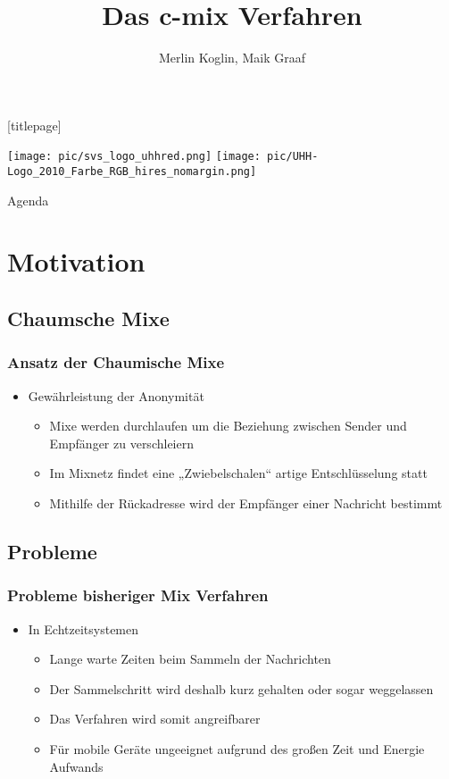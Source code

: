 \documentclass[t, xcolor=dvipsnames]{beamer}
\title{Das c-mix Verfahren }
\author[Merlin Koglin, Maik Graaf]{Merlin Koglin, Maik Graaf}
\date{}
\begin{document}
\begingroup
	[titlepage]
	\begin{frame}[plain]
		\vskip8mm
		\texttt{[image: pic/svs\_logo\_uhhred.png]}
		\titlepage
		\vspace{\fill}
		\texttt{[image: pic/UHH-Logo\_2010\_Farbe\_RGB\_hires\_nomargin.png]}
		\vskip20pt
	\end{frame}
\endgroup

\begin{frame}{Agenda}
	\tableofcontents
\end{frame}

\section{Motivation} %

\subsection{Chaumsche Mixe} %
\begin{frame}
	\frametitle{Ansatz der Chaumische Mixe}
	\begin{itemize}
		\item Gewährleistung der Anonymität
			\begin{itemize}
				\item Mixe werden durchlaufen um die Beziehung zwischen Sender und Empfänger zu verschleiern
		        \item Im Mixnetz findet eine „Zwiebelschalen“ artige Entschlüsselung statt
		        \item Mithilfe der Rückadresse wird der Empfänger einer Nachricht bestimmt
			\end{itemize}
	\end{itemize}
	\vspace{\fill}
\end{frame}
\subsection{Probleme} %
\begin{frame}
	\frametitle{Probleme bisheriger Mix Verfahren}
	\begin{itemize}
		\item In Echtzeitsystemen
			\begin{itemize}
				\item Lange warte Zeiten beim Sammeln der Nachrichten
				\item Der Sammelschritt wird deshalb kurz gehalten oder sogar weggelassen
				\item Das Verfahren wird somit angreifbarer
				\item Für mobile Geräte ungeeignet aufgrund des großen Zeit und Energie Aufwands
			\end{itemize}
	\end{itemize}
	\vspace{\fill}
\end{frame}
\end{document}
